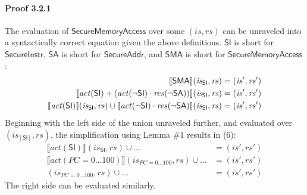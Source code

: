\documentclass[12pt, letterpaper]{article}
\begin{document}
 \paragraph{Proof 3.2.1}
     The evaluation of $\mathsf{SecureMemoryAccess}$ over some $(\mathit{is},\mathit{rs})$ can be unraveled into a syntactically correct equation given the above definitions.  $\mathsf{SI}$ is short for $\mathsf{SecureInstr}$, $\mathsf{SA}$ is short for $\mathsf{SecureAddr}$, and $\mathsf{SMA}$ is short for $\mathsf{SecureMemoryAccess}$:
 \begin{align}
     \setcounter{equation}{0}
     \llbracket \mathsf{SMA} \rrbracket (\mathit{is_{\mathsf{SI}}}, \mathit{rs})
     &=
     (\mathit{is}', \mathit{rs}')
     \\
     \llbracket \mathit{act}(\mathsf{SI}) +
     (\mathit{act}(\neg\mathsf{SI}) \cdot
      \mathit{res}(\neg\mathsf{SA})) \rrbracket (\mathit{is_{\mathsf{SI}}}, \mathit{rs})
     &=
     (\mathit{is}', \mathit{rs}')
     \\
     \llbracket \mathit{act}(\mathsf{SI}) \rrbracket (\mathit{is_{\mathsf{SI}}}, \mathit{rs}) \cup %
     \llbracket \mathit{act}(\neg\mathsf{SI}) \cdot
      \mathit{res}(\neg\mathsf{SA}) \rrbracket (\mathit{is_{\mathsf{SI}}}, \mathit{rs})
     &=
     (\mathit{is}', \mathit{rs}')
 \end{align}
     Beginning with the left side of the union unraveled further, and evaluated over $(\mathit{is}_{[\mathsf{SI}]},\mathit{rs})$, the simplification using Lemma \#1 results in (6):
 \begin{align}
     \llbracket \mathit{act} (\mathsf{SI}) \rrbracket (\mathit{is_{\mathsf{SI}}}, \mathit{rs}) \cup \ldots
     &=
     (\mathit{is}', \mathit{rs}')
     \\
     \llbracket \mathit{act} (PC=0\ldots 100) \rrbracket (\mathit{is_{PC=0\ldots100}}, \mathit{rs}) \cup \ldots %
     &=
     (\mathit{is}', \mathit{rs}')
     \\
     (\mathit{is_{PC=0\ldots100}}, \mathit{rs}) \cup \ldots 
     &=
     (\mathit{is}', \mathit{rs}')
 \end{align}
     The right side can be evaluated similarly.
\end{document}
